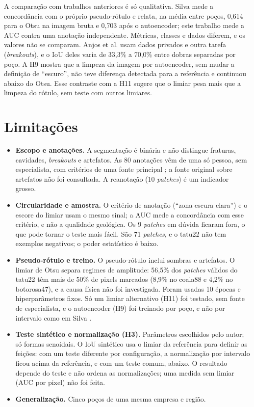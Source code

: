 \documentclass[12pt]{article}
\newif\ifrascunho \rascunhofalse
\newcommand{\fonte}[1]{\ifrascunho\textcolor{blue}{\small(README, #1)}\fi}
\begin{document}
A comparação com trabalhos anteriores é só qualitativa. Silva \cite{silva2026} mede a concordância com o próprio pseudo-rótulo e relata, na média entre poços, 0,614 para o Otsu na imagem bruta e 0,703 após o autoencoder; este trabalho mede a AUC contra uma anotação independente. Métricas, classes e dados diferem, e os valores não se comparam. Anjos et al. \cite{anjos2022} usam dados privados e outra tarefa (\textit{breakouts}), e o IoU deles varia de 33,3\% a 70,0\% entre dobras separadas por poço. A H9 mostra que a limpeza da imagem por autoencoder, sem mudar a definição de ``escuro'', não teve diferença detectada para a referência e continuou abaixo do Otsu. Esse contraste com a H11 sugere que o limiar pesa mais que a limpeza do rótulo, sem teste com outros limiares.

\section{Limitações}\label{sec:lim}

\begin{itemize}
\item \textbf{Escopo e anotações.} A segmentação é binária e não distingue fraturas, cavidades, \textit{breakouts} e artefatos. As 80 anotações vêm de uma só pessoa, sem especialista, com critérios de uma fonte principal \cite{fioriti2026}; a fonte original sobre artefatos \cite{lofts1999} não foi consultada. A reanotação (10 \textit{patches}) é um indicador grosso. \fonte{U7, U8, U18}
\item \textbf{Circularidade e amostra.} O critério de anotação (``zona escura clara'') e o escore do limiar usam o mesmo sinal; a AUC mede a concordância com esse critério, e não a qualidade geológica. Os 9 \textit{patches} em dúvida ficaram fora, o que pode tornar o teste mais fácil. São 71 \textit{patches}, e o tatu22 não tem exemplos negativos; o poder estatístico é baixo. \fonte{U9, U11, U14}
\item \textbf{Pseudo-rótulo e treino.} O pseudo-rótulo inclui sombras e artefatos. O limiar de Otsu separa regimes de amplitude: 56,5\% dos \textit{patches} válidos do tatu22 têm mais de 50\% de pixels marcados (8,9\% no coala88 e 4,2\% no botorosa47), e a causa física não foi investigada. Foram usadas 10 épocas e hiperparâmetros fixos. Só um limiar alternativo (H11) foi testado, sem fonte de especialista, e o autoencoder (H9) foi treinado por poço, e não por intervalo como em Silva \cite{silva2026}. \fonte{U12, U13, U23}
\item \textbf{Teste sintético e normalização (H3).} Parâmetros escolhidos pelo autor; só formas senoidais. O IoU sintético usa o limiar da referência para definir as feições: com um teste diferente por configuração, a normalização por intervalo ficou acima da referência, e com um teste comum, abaixo. O resultado depende do teste e não ordena as normalizações; uma medida sem limiar (AUC por pixel) não foi feita. \fonte{U15, U22, U24}
\item \textbf{Generalização.} Cinco poços de uma mesma empresa e região. \fonte{U19}
\end{itemize}
\end{document}
